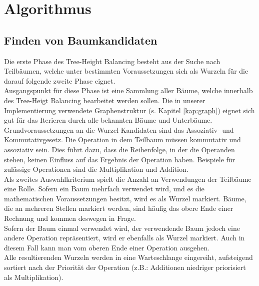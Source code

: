 \chapter{Algorithmus}



\section{Finden von Baumkandidaten}
Die erste Phase des Tree-Height Balancing besteht aus der Suche nach Teilbäumen, welche unter bestimmten Voraussetzungen sich als Wurzeln für die darauf folgende zweite Phase eignet.\\
Ausgangspunkt für diese Phase ist eine Sammlung aller Bäume, welche innerhalb des Tree-Heigt Balancing bearbeitet werden sollen. Die in unserer Implementierung verwendete Graphenstruktur (s. Kapitel \ref{kap:graph}) eignet sich gut für das Iterieren durch alle bekannten Bäume und Unterbäume.\\
Grundvoraussetzungen an die Wurzel-Kandidaten sind das Assoziativ- und Kommutativgesetz. Die Operation in dem Teilbaum müssen kommutativ und assoziativ sein. Dies führt dazu, dass die Reihenfolge, in der die Operanden stehen, keinen Einfluss auf das Ergebnis der Operation haben. Beispiele für zulässige Operationen sind die Multiplikation und Addition.\\
Als zweites Auswahlkriterium spielt die Anzahl an Verwendungen der Teilbäume eine Rolle. Sofern ein Baum mehrfach verwendet wird, und es die mathematischen Voraussetzungen besitzt, wird es als Wurzel markiert. Bäume, die an mehreren Stellen markiert werden, sind häufig das obere Ende einer Rechnung und kommen deswegen in Frage.\\
Sofern der Baum einmal verwendet wird, der verwendende Baum jedoch eine andere Operation repräsentiert, wird er ebenfalls als Wurzel markiert. Auch in diesem Fall kann man vom oberen Ende einer Operation ausgehen.\\
Alle resultierenden Wurzeln werden in eine Warteschlange eingereiht, aufsteigend sortiert nach der Priorität der Operation (z.B.: Additionen niedriger priorisiert als Multiplikation).\\

